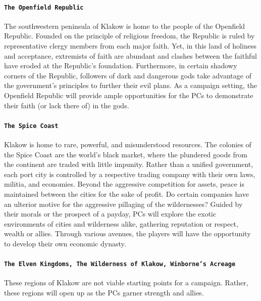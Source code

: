 \documentclass[12pt]{article}
\begin{document}
\paragraph{\texttt{The Openfield Republic}} 
\textsf{The southwestern peninsula of Klakow is home to the people of the Openfield Republic. Founded on the principle of religious freedom, the Republic is ruled by representative clergy members from each major faith. Yet, in this land of holiness and acceptance, extremists of faith are abundant and clashes between the faithful have eroded at the Republic's foundation. Furthermore, in certain shadowy corners of the Republic, followers of dark and dangerous gods take advantage of the government's principles to further their evil plans. As a campaign setting, the Openfield Republic will provide ample opportunities for the PCs to demonstrate their faith (or lack there of) in the gods.}

\paragraph{\texttt{The Spice Coast}} 
\textsf{Klakow is home to rare, powerful, and misunderstood resources. The colonies of the Spice Coast are the world's black market, where the plundered goods from the continent are traded with little impunity. Rather than a unified government, each port city is controlled by a respective trading company with their own laws, militia, and economies. Beyond the aggressive competition for assets, peace is maintained between the cities for the sake of profit. Do certain companies have an ulterior motive for the aggressive pillaging of the wildernesses? Guided by their morals or the prospect of a payday, PCs will explore the exotic environments of cities and wilderness alike, gathering reputation or respect, wealth or allies. Through various avenues, the players will have the opportunity to develop their own economic dynasty.}

\paragraph{\texttt{The Elven Kingdoms, The Wilderness of Klakow, Winborne's Acreage}} 
\textsf{These regions of Klakow are not viable starting points for a campaign. Rather, these regions will open up as the PCs garner strength and allies.}
\end{document}
